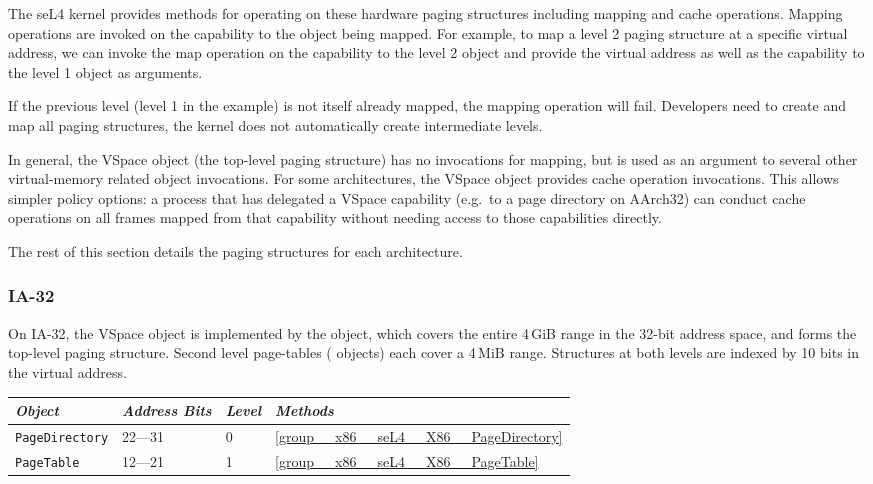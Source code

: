 The seL4 kernel provides methods for operating on these hardware paging structures including mapping
and cache operations. Mapping operations are invoked on the capability to the object being mapped.
For example, to map a level 2 paging structure at a specific virtual address, we can invoke the map
operation on the capability to the level 2 object and provide the virtual address as well as the
capability to the level 1 object as arguments.

If the previous level (level 1 in the example) is not itself already mapped, the mapping operation
will fail. Developers need to create and map all paging structures, the kernel does not
automatically create intermediate levels.

In general, the VSpace object (the top-level paging structure) has no invocations for mapping, but
is used as an argument to several other virtual-memory related object invocations. For some
architectures, the VSpace object provides cache operation invocations. This allows simpler
policy options: a process that has delegated a VSpace capability (e.g.\ to a page directory on
AArch32) can conduct cache operations on all frames mapped from that capability without needing
access to those capabilities directly.

The rest of this section details the paging structures for each architecture.

\subsubsection{IA-32}

On IA-32, the VSpace object is implemented by the  object, which covers the
entire 4\,GiB range in the 32-bit address space, and forms the top-level paging structure. Second
level page-tables ( objects) each cover a 4\,MiB range. Structures at both levels
are indexed by 10 bits in the virtual address.

\begin{tabularx}{\textwidth}{Xlll} \toprule
\emph{Object}          & \emph{Address Bits} & \emph{Level} & \emph{Methods} \\ \midrule
\texttt{PageDirectory} & 22---31             & 0            & \autoref{group__x86__seL4__X86__PageDirectory} \\
\texttt{PageTable}     & 12---21             & 1            & \autoref{group__x86__seL4__X86__PageTable} \\
\bottomrule
\end{tabularx}

